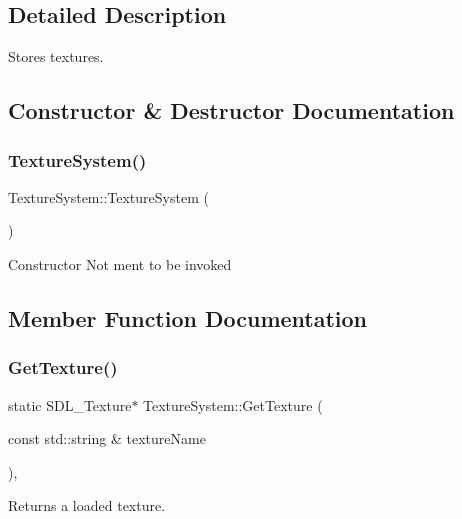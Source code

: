 \subsection{Detailed Description}
Stores textures. 

\subsection{Constructor \& Destructor Documentation}
\mbox{\label{class_texture_system_a3d2ff8744c36cdb154a74b8f78b11f08}} 
\subsubsection{\texorpdfstring{Texture\+System()}{TextureSystem()}}
{\footnotesize\ttfamily Texture\+System\+::\+Texture\+System (\begin{DoxyParamCaption}{ }\end{DoxyParamCaption})\hspace{0.3cm}{\ttfamily [delete]}}

Constructor Not ment to be invoked 

\subsection{Member Function Documentation}
\mbox{\label{class_texture_system_a1fb557835bcd6aead8e3d03358d2363e}} 
\subsubsection{\texorpdfstring{Get\+Texture()}{GetTexture()}}
{\footnotesize\ttfamily static S\+D\+L\+\_\+\+Texture$\ast$ Texture\+System\+::\+Get\+Texture (\begin{DoxyParamCaption}\item[{const std\+::string \&}]{texture\+Name }\end{DoxyParamCaption})\hspace{0.3cm}{\ttfamily [inline]}, {\ttfamily [static]}}



Returns a loaded texture. 


